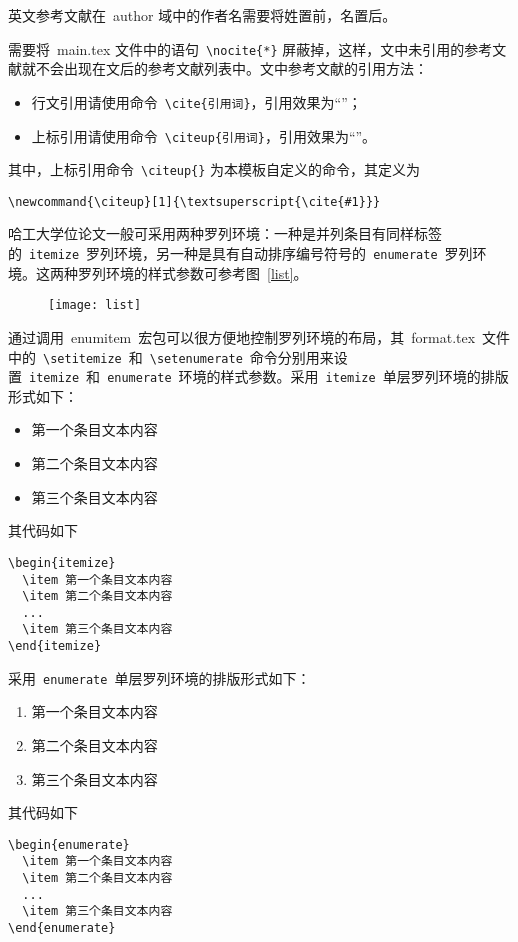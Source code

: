 英文参考文献在~author 域中的作者名需要将姓置前，名置后。

需要将~main.tex 文件中的语句~\verb|\nocite{*}| 屏蔽掉，这样，文中未引用的参考文献就不会出现在文后的参考文献列表中。文中参考文献的引用方法：

\begin{itemize}
\item 行文引用请使用命令~\verb|\cite{引用词}|，引用效果为“\cite{lin1992}”；
\item 上标引用请使用命令~\verb|\citeup{引用词}|，引用效果为“”。
\end{itemize}
其中，上标引用命令~\verb|\citeup{}| 为本模板自定义的命令，其定义为
\begin{verbatim}
\newcommand{\citeup}[1]{\textsuperscript{\cite{#1}}}
\end{verbatim}

哈工大学位论文一般可采用两种罗列环境：一种是并列条目有同样标签的~\verb|itemize|~罗列环境，另一种是具有自动排序编号符号的~\verb|enumerate|~罗列环境。这两种罗列环境的样式参数可参考图~\ref{list}。
\begin{figure}[htbp]
\centering
\texttt{[image: list]}
\vspace{-1em}
\end{figure}
通过调用~enumitem~宏包可以很方便地控制罗列环境的布局，其~format.tex~文件中的~\verb|\setitemize|~和~\verb|\setenumerate|~命令分别用来设置~\verb|itemize|~和~\verb|enumerate|~环境的样式参数。采用~\verb|itemize|~单层罗列环境的排版形式如下：
\begin{itemize}
\item 第一个条目文本内容
\item 第二个条目文本内容
\item 第三个条目文本内容
\end{itemize}
其代码如下
\begin{verbatim}
\begin{itemize}
  \item 第一个条目文本内容
  \item 第二个条目文本内容
  ...
  \item 第三个条目文本内容
\end{itemize}
\end{verbatim}
采用~\verb|enumerate|~单层罗列环境的排版形式如下：
\begin{enumerate}
\item 第一个条目文本内容
\item 第二个条目文本内容
\item 第三个条目文本内容
\end{enumerate}
其代码如下
\begin{verbatim}
\begin{enumerate}
  \item 第一个条目文本内容
  \item 第二个条目文本内容
  ...
  \item 第三个条目文本内容
\end{enumerate}
\end{verbatim}

